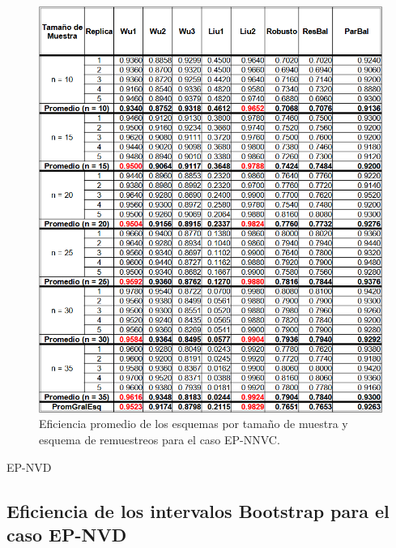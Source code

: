 \begin{figure}[ht] 
	\centering 
	\includegraphics[width=0.9\linewidth]{img/EP_NNVC_Efic_Esq.png} 
	\caption{Eficiencia promedio de los esquemas por tamaño de muestra y esquema de remuestreos para el caso EP-NNVC.} 
	\label{fig:EP_NNVC_Esq}
\end{figure}

EP-NVD
\subsection{Eficiencia de los intervalos Bootstrap para el caso EP-NVD}

